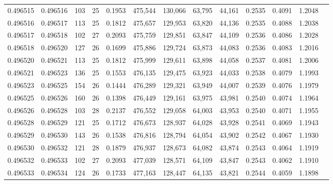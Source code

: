 \begin{tabular}{rrrrrrrrrrrrr}
0.496515 & 0.496516 & 103 &  25 &                                     0.1953 & 475,544 & 130,066 &  63,795 &  44,161 & 0.2535 & 0.4091 & 1.2048 \\
0.496516 & 0.496517 & 113 &  25 &                                     0.1812 & 475,657 & 129,953 &  63,820 &  44,136 & 0.2535 & 0.4088 & 1.2038 \\
0.496517 & 0.496518 & 102 &  27 &                                     0.2093 & 475,759 & 129,851 &  63,847 &  44,109 & 0.2536 & 0.4086 & 1.2028 \\
0.496518 & 0.496520 & 127 &  26 &                                     0.1699 & 475,886 & 129,724 &  63,873 &  44,083 & 0.2536 & 0.4083 & 1.2016 \\
0.496520 & 0.496521 & 113 &  25 &                                     0.1812 & 475,999 & 129,611 &  63,898 &  44,058 & 0.2537 & 0.4081 & 1.2006 \\
0.496521 & 0.496523 & 136 &  25 &                                     0.1553 & 476,135 & 129,475 &  63,923 &  44,033 & 0.2538 & 0.4079 & 1.1993 \\
0.496523 & 0.496525 & 154 &  26 &                                     0.1444 & 476,289 & 129,321 &  63,949 &  44,007 & 0.2539 & 0.4076 & 1.1979 \\
0.496525 & 0.496526 & 160 &  26 &                                     0.1398 & 476,449 & 129,161 &  63,975 &  43,981 & 0.2540 & 0.4074 & 1.1964 \\
0.496526 & 0.496528 & 103 &  28 &                                     0.2137 & 476,552 & 129,058 &  64,003 &  43,953 & 0.2540 & 0.4071 & 1.1955 \\
0.496528 & 0.496529 & 121 &  25 &                                     0.1712 & 476,673 & 128,937 &  64,028 &  43,928 & 0.2541 & 0.4069 & 1.1943 \\
0.496529 & 0.496530 & 143 &  26 &                                     0.1538 & 476,816 & 128,794 &  64,054 &  43,902 & 0.2542 & 0.4067 & 1.1930 \\
0.496530 & 0.496532 & 121 &  28 &                                     0.1879 & 476,937 & 128,673 &  64,082 &  43,874 & 0.2543 & 0.4064 & 1.1919 \\
0.496532 & 0.496533 & 102 &  27 &                                     0.2093 & 477,039 & 128,571 &  64,109 &  43,847 & 0.2543 & 0.4062 & 1.1910 \\
0.496533 & 0.496534 & 124 &  26 &                                     0.1733 & 477,163 & 128,447 &  64,135 &  43,821 & 0.2544 & 0.4059 & 1.1898 \\

\end{tabular}
